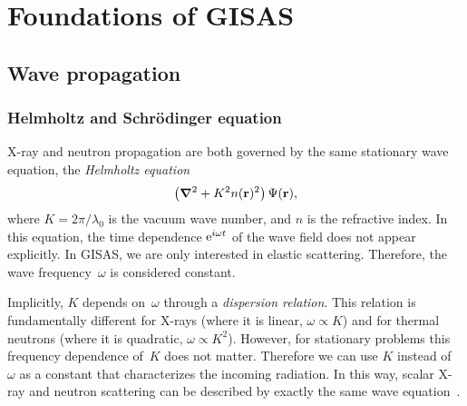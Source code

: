 

\chapter{Foundations of GISAS}  


\section{Wave propagation}

\subsection{Helmholtz and Schr\"odinger equation}

X-ray and neutron propagation are both governed by
the same stationary wave equation,
the \textit{Helmholtz equation}
\begin{equation}\label{eq:Helmholtz}
  \left(\bm{\nabla}^2+K^2n(\mathbf{r})^2\right)\Psi(\mathbf{r}),
\end{equation}
where $K=2\pi/\lambda_0$ is the vacuum wave number,
and $n$ is the refractive index.
In this equation,
the time dependence ${\rm e}^{i\omega t}$ of the wave field
does not appear explicitly.
In GISAS, we are only interested in elastic scattering.
Therefore, the wave frequency~$\omega$ is considered constant.

Implicitly, $K$ depends on~$\omega$ through a \textit{dispersion relation}.
This relation is fundamentally different for
X-rays (where it is linear, $\omega\propto K$)
and for thermal neutrons (where it is quadratic, $\omega\propto K^2$).
However, for stationary problems
this frequency dependence of~$K$ does not matter.
Therefore we can use $K$ instead of~$\omega$ as a constant
that characterizes the incoming radiation.
In this way, scalar X-ray and neutron scattering can be described by exactly
the same wave equation~.

